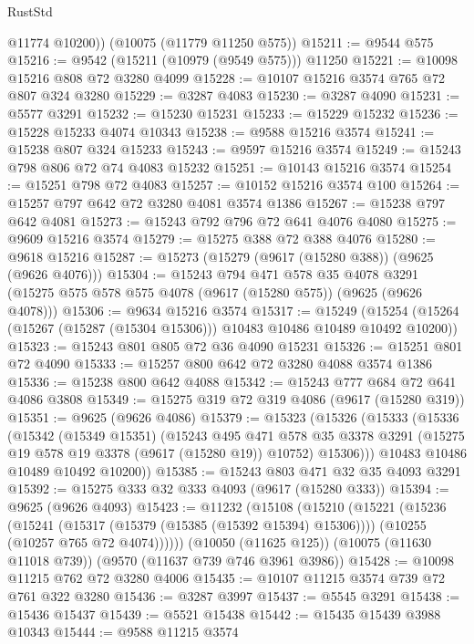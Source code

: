 \begin{lexlean}{RustStd}
\begin{coremodule}
{\begin{coremodule}
{{{{{{{{{{{{{{{{{{{{{{{{{{{{{{{{{        @11774
        @10200))
    (@10075 (@11779 @11250 @575))
@15211 := @9544 @575
@15216 := @9542 (@15211 (@10979 (@9549 @575))) @11250
@15221 := @10098 @15216 @808 @72 @3280 @4099
@15228 := @10107 @15216 @3574 @765 @72 @807 @324 @3280
@15229 := @3287 @4083
@15230 := @3287 @4090
@15231 := @5577 @3291
@15232 := @15230 @15231
@15233 := @15229 @15232
@15236 := @15228 @15233 @4074 @10343
@15238 := @9588 @15216 @3574
@15241 := @15238 @807 @324 @15233
@15243 := @9597 @15216 @3574
@15249 := @15243 @798 @806 @72 @74 @4083 @15232
@15251 := @10143 @15216 @3574
@15254 := @15251 @798 @72 @4083
@15257 := @10152 @15216 @3574 @100
@15264 := @15257 @797 @642 @72 @3280 @4081 @3574 @1386
@15267 := @15238 @797 @642 @4081
@15273 := @15243 @792 @796 @72 @641 @4076 @4080
@15275 := @9609 @15216 @3574
@15279 := @15275 @388 @72 @388 @4076
@15280 := @9618 @15216
@15287 := @15273 (@15279 (@9617 (@15280 @388)) (@9625 (@9626 @4076)))
@15304 := @15243
    @794
    @471
    @578
    @35
    @4078
    @3291
    (@15275 @575 @578 @575 @4078 (@9617 (@15280 @575)) (@9625 (@9626 @4078)))
@15306 := @9634 @15216 @3574
@15317 := @15249
    (@15254 (@15264 (@15267 (@15287 (@15304 @15306))) @10483 @10486 @10489 @10492 @10200))
@15323 := @15243 @801 @805 @72 @36 @4090 @15231
@15326 := @15251 @801 @72 @4090
@15333 := @15257 @800 @642 @72 @3280 @4088 @3574 @1386
@15336 := @15238 @800 @642 @4088
@15342 := @15243 @777 @684 @72 @641 @4086 @3808
@15349 := @15275 @319 @72 @319 @4086 (@9617 (@15280 @319))
@15351 := @9625 (@9626 @4086)
@15379 := @15323
    (@15326
      (@15333
        (@15336
          (@15342
            (@15349 @15351)
            (@15243
              @495
              @471
              @578
              @35
              @3378
              @3291
              (@15275 @19 @578 @19 @3378 (@9617 (@15280 @19)) @10752)
              @15306)))
        @10483
        @10486
        @10489
        @10492
        @10200))
@15385 := @15243 @803 @471 @32 @35 @4093 @3291
@15392 := @15275 @333 @32 @333 @4093 (@9617 (@15280 @333))
@15394 := @9625 (@9626 @4093)
@15423 := @11232
    (@15108
      (@15210
        (@15221
          (@15236
            (@15241 (@15317 (@15379 (@15385 (@15392 @15394) @15306))))
            (@10255 (@10257 @765 @72 @4074))))))
    (@10050 (@11625 @125))
    (@10075 (@11630 @11018 @739))
    (@9570 (@11637 @739 @746 @3961 @3986))
@15428 := @10098 @11215 @762 @72 @3280 @4006
@15435 := @10107 @11215 @3574 @739 @72 @761 @322 @3280
@15436 := @3287 @3997
@15437 := @5545 @3291
@15438 := @15436 @15437
@15439 := @5521 @15438
@15442 := @15435 @15439 @3988 @10343
@15444 := @9588 @11215 @3574
}}}}}}}}}}}}}}}}}}}}}}}}}}}}}}}}}
\end{coremodule}}
\end{coremodule}
\end{lexlean}
